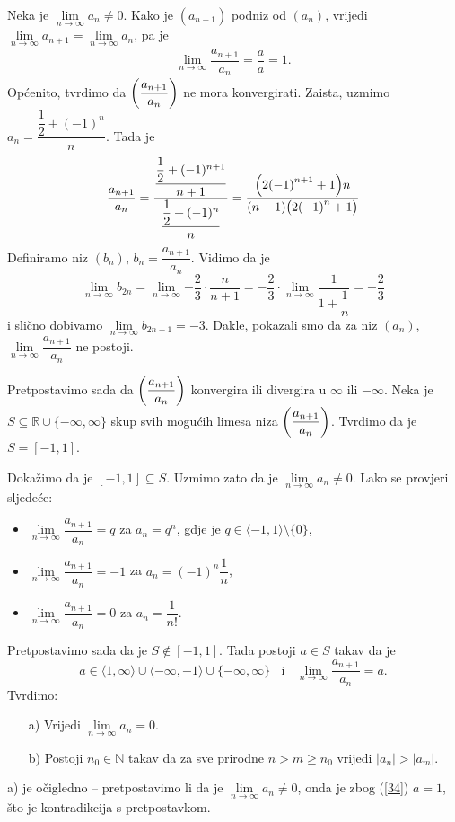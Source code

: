 \documentclass{book}
\let\originalleft\left
\let\originalright\right
\renewcommand{\left}{\mathopen{}\mathclose\bgroup\originalleft}
\renewcommand{\right}{\aftergroup\egroup\originalright}
\renewenvironment{proof}{%
    \vspace{-\parskip}\begin{oldproof}%
    }{%
    \end{oldproof}%
}
\theoremstyle{definition}
\theoremstyle{definition}
\theoremstyle{remark}
\begin{document}
\begin{proof}[Rješenje]
Neka je $\lim\limits_{n\to \infty}{a_n}\neq 0$. Kako je $(a_{n+1})$ podniz od $(a_n)$, vrijedi $\lim\limits_{n\to \infty}{a_{n+1}}=\lim\limits_{n\to \infty}{a_{n}}$, pa je
\begin{gather}
\label{34}
\lim\limits_{n\to \infty}{\dfrac{a_{n+1}}{a_n}}=\dfrac{a}{a}=1.
\end{gather}
Općenito, tvrdimo da $\left(\dfrac{a_{n+1}}{a_n}\right)$ ne mora konvergirati. Zaista, uzmimo $a_n=\dfrac{\dfrac{1}{2}+(-1)^n}{n}$. Tada je
$$\dfrac{a_{n+1}}{a_n}=\dfrac{\dfrac{\dfrac{1}{2}+(-1)^{n+1}}{n+1}}{\dfrac{\dfrac{1}{2}+(-1)^n}{n}}=\dfrac{\left(2\left(-1\right)^{n+1}+1\right)n}{\left(n+1\right)\left(2\left(-1\right)^n+1\right)}$$
Definiramo niz $(b_n)$, $b_n=\dfrac{a_{n+1}}{a_n}$. Vidimo da je $$\lim\limits_{n\to \infty}{b_{2n}}=\lim\limits_{n\to \infty}{-\dfrac{2}{3}\cdot \dfrac{n}{n+1}}=-\dfrac{2}{3}\cdot \lim\limits_{n\to \infty}{\dfrac{1}{1+\dfrac{1}{n}}}=-\dfrac{2}{3}$$
i slično dobivamo $\lim\limits_{n\to \infty}{b_{2n+1}}=-3$. Dakle, pokazali smo da za niz $(a_n)$, $\lim\limits_{n\to \infty}{\dfrac{a_{n+1}}{a_n}}$ ne postoji.

Pretpostavimo sada da $\left(\dfrac{a_{n+1}}{a_n}\right)$ konvergira ili divergira u $\infty$ ili $-\infty$. Neka je $S\subseteq \mathbb{R}\cup \{-\infty, \infty\}$ skup svih mogućih limesa niza $\left(\dfrac{a_{n+1}}{a_n}\right)$. Tvrdimo da je $S=[-1, 1]$. 

Dokažimo da je $[-1, 1]\subseteq S$. Uzmimo zato da je $\lim\limits_{n\to \infty}{a_n}\neq 0$. Lako se provjeri sljedeće:
\begin{itemize}
\item $\lim\limits_{n\to \infty}{\dfrac{a_{n+1}}{a_n}}=q$ za $a_n=q^n$, gdje je $q\in \langle -1, 1\rangle\setminus\{0\}$,
\item $\lim\limits_{n\to \infty}{\dfrac{a_{n+1}}{a_n}}=-1$ za $a_n=(-1)^n\dfrac{1}{n}$,
\item $\lim\limits_{n\to \infty}{\dfrac{a_{n+1}}{a_n}}=0$ za $a_n=\dfrac{1}{n!}$.
\end{itemize}

Pretpostavimo sada da je $S\notin [-1, 1]$. Tada postoji  $a\in S$ takav da je $$a\in \langle 1, \infty\rangle\cup \langle -\infty, -1\rangle\cup \{-\infty, \infty\}\;\;\text{ i }\;\;\lim\limits_{n\to \infty}{\dfrac{a_{n+1}}{a_n}}=a.$$ Tvrdimo:
\begin{itemize}
\item[a)] Vrijedi $\lim\limits_{n\to \infty}{a_n}=0$.
\item[b)] Postoji $n_0\in \mathbb{N}$ takav da za sve prirodne $n>m\geq n_0$ vrijedi $|a_{n}|>|a_m|$.
\end{itemize}
a) je očigledno -- pretpostavimo li da je $\lim\limits_{n\to \infty}{a_n}\neq 0$, onda je zbog (\ref{34}) $a=1$, što je kontradikcija s pretpostavkom.
 

\end{proof}
\end{document}
